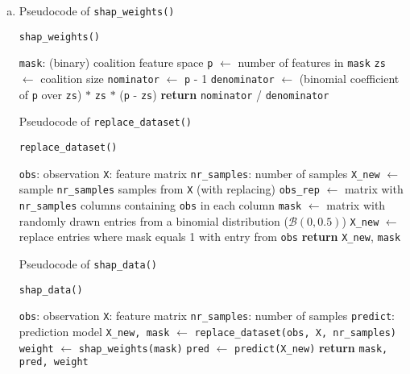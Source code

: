 {\begin{enumerate}[a)]
	\item Pseudocode of \texttt{shap\_weights()}
	
	\begin{algorithm}[H]
		\caption{\texttt{shap\_weights()}}
		\begin{algorithmic}[1]
			\Require \texttt{mask}: (binary) coalition feature space
			\State \texttt{p} $\gets$ number of features in \texttt{mask}
			\State \texttt{zs} $\gets$ coalition size 
			\State \texttt{nominator} $\gets$ \texttt{p} - 1
			\State \texttt{denominator} $\gets$ (binomial coefficient of \texttt{p} over \texttt{zs}) $*$ \texttt{zs} $*$ (\texttt{p} - \texttt{zs})
			\State \textbf{return} \texttt{nominator} / \texttt{denominator}
		\end{algorithmic}
	\end{algorithm}

	Pseudocode of \texttt{replace\_dataset()}
	
	\begin{algorithm}[H]
		\caption{\texttt{replace\_dataset()}}
		\begin{algorithmic}[1]
			\Require \texttt{obs}: observation
			\Require \texttt{X}: feature matrix
			\Require \texttt{nr\_samples}: number of samples
			\State \texttt{X\_new} $\gets$ sample \texttt{nr\_samples} samples from \texttt{X} (with replacing)
			\State \texttt{obs\_rep} $\gets$ matrix with \texttt{nr\_samples} columns containing \texttt{obs} in each column
			\State \texttt{mask} $\gets$ matrix with randomly drawn entries from a binomial distribution ($\mathcal{B}(0, 0.5)$)
			\State \texttt{X\_new} $\gets$ replace entries where mask equals 1 with entry from \texttt{obs}
			\State \textbf{return} \texttt{X\_new}, \texttt{mask}
		\end{algorithmic}
	\end{algorithm}

	Pseudocode of \texttt{shap\_data()}
	
	\begin{algorithm}[H]
		\caption{\texttt{shap\_data()}}
		\begin{algorithmic}[1]
			\Require \texttt{obs}: observation
			\Require \texttt{X}: feature matrix
			\Require \texttt{nr\_samples}: number of samples
			\Require \texttt{predict}: prediction model
			\State \texttt{X\_new, mask} $\gets$ \texttt{replace\_dataset(obs, X, nr\_samples)}
			\State \texttt{weight} $\gets$ \texttt{shap\_weights(mask)}
			\State \texttt{pred} $\gets$ \texttt{predict(X\_new)}
			\State \textbf{return} \texttt{mask, pred, weight}
		\end{algorithmic}
	\end{algorithm}


\end{enumerate}}

